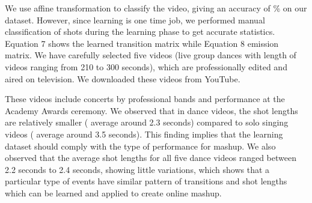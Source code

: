 \documentclass{sig-alternate}
\begin{document}
We use affine transformation to classify the video, giving an accuracy of \% on our dataset. However, since learning is one time job, we performed manual classification of shots during the learning phase to get accurate statistics. Equation 7 shows the learned transition matrix while Equation 8 emission matrix. We have carefully selected five videos (live group dances with length of videos ranging from 210 to 300 seconds), which are professionally edited and aired on television. We downloaded these videos from YouTube.

These videos include concerts by professional bands and performance at the Academy Awards ceremony. We observed that in dance videos, the shot lengths are relatively smaller ( average around 2.3 seconds) compared to solo singing videos ( average around 3.5 seconds). This finding implies that the learning dataset should comply with the type of performance for mashup. We also observed that the average shot lengths for all five dance videos ranged between 2.2 seconds to 2.4 seconds, showing little variations, which shows that a particular type of events have similar pattern of transitions and shot lengths which can be learned and applied to create online mashup.
\end{document}
